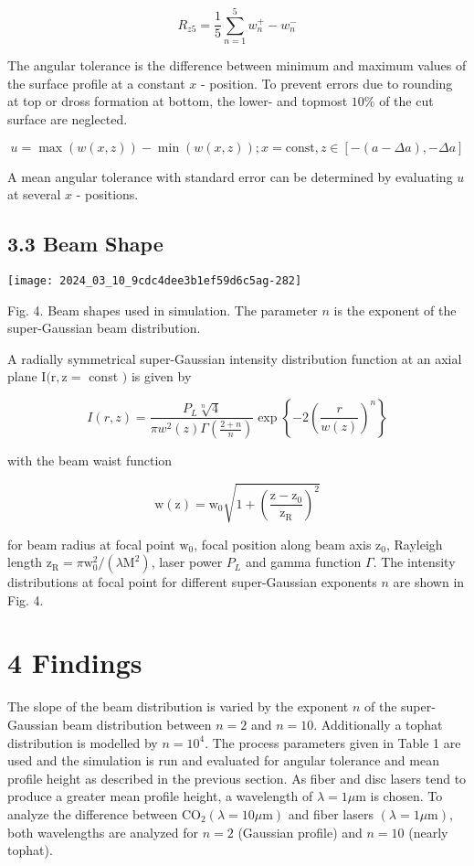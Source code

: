 \documentclass[10pt]{article}
\begin{document}
$$
R_{z 5}=\frac{1}{5} \sum_{n=1}^{5} w_{n}^{+}-w_{n}^{-}
$$

The angular tolerance is the difference between minimum and maximum values of the surface profile at a constant $x$ - position. To prevent errors due to rounding at top or dross formation at bottom, the lower- and topmost $10 \%$ of the cut surface are neglected.

$$
u=\max (w(x, z))-\min (w(x, z)) ; x=\mathrm{const}, z \in[-(a-\Delta a),-\Delta a]
$$

A mean angular tolerance with standard error can be determined by evaluating $u$ at several $x$ - positions.

\subsection*{3.3 Beam Shape}
\begin{center}
\texttt{[image: 2024\_03\_10\_9cdc4dee3b1ef59d6c5ag-282]}
\end{center}

Fig. 4. Beam shapes used in simulation. The parameter $n$ is the exponent of the super-Gaussian beam distribution.

A radially symmetrical super-Gaussian intensity distribution function at an axial plane $\mathrm{I}(\mathrm{r}, \mathrm{z}=$ const $)$ is given by

$$
I(r, z)=\frac{P_{L} \sqrt[n]{4}}{\pi w^{2}(z) \Gamma\left(\frac{2+n}{n}\right)} \exp \left\{-2\left(\frac{r}{w(z)}\right)^{n}\right\}
$$

with the beam waist function

$$
\mathrm{w}(\mathrm{z})=\mathrm{w}_{0} \sqrt{1+\left(\frac{\mathrm{z}-\mathrm{z}_{0}}{\mathrm{z}_{\mathrm{R}}}\right)^{2}}
$$

for beam radius at focal point $\mathrm{w}_{0}$, focal position along beam axis $\mathrm{z}_{0}$, Rayleigh length $\mathrm{z}_{\mathrm{R}}=\pi \mathrm{w}_{0}^{2} /\left(\lambda \mathrm{M}^{2}\right)$, laser power $P_{L}$ and gamma function $\Gamma$. The intensity distributions at focal point for different super-Gaussian exponents $n$ are shown in Fig. 4.

\section*{4 Findings}
The slope of the beam distribution is varied by the exponent $n$ of the super-Gaussian beam distribution between $n=2$ and $n=10$. Additionally a tophat distribution is modelled by $n=10^{4}$. The process parameters given in Table 1 are used and the simulation is run and evaluated for angular tolerance and mean profile height as described in the previous section. As fiber and disc lasers tend to produce a greater mean profile height, a wavelength of $\lambda=1 \mu \mathrm{m}$ is chosen. To analyze the difference between $\mathrm{CO}_{2}(\lambda=10 \mu \mathrm{m})$ and fiber lasers $(\lambda=1 \mu \mathrm{m})$, both wavelengths are analyzed for $n=2$ (Gaussian profile) and $n=10$ (nearly tophat).
\end{document}
